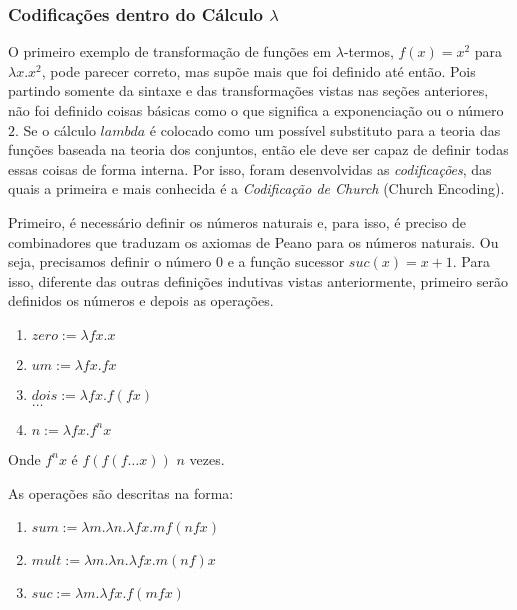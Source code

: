 \documentclass[../main.tex]{subfiles}
\begin{document}
\subsubsection{Codificações dentro do Cálculo \texorpdfstring{$\lambda$}.}

O primeiro exemplo de transformação de funções em $\lambda$-termos, $f(x) = x^2$ para $\lambda x . x^2$, pode parecer correto, mas supõe mais que foi definido até então. Pois partindo somente da sintaxe e das transformações vistas nas seções anteriores, não foi definido coisas básicas como o que significa a exponenciação ou o número $2$. Se o cálculo $lambda$ é colocado como um possível substituto para a teoria das funções baseada na teoria dos conjuntos, então ele deve ser capaz de definir todas essas coisas de forma interna. Por isso, foram desenvolvidas as \emph{codificações}, das quais a primeira e mais conhecida é a \emph{Codificação de Church} (Church Encoding).

Primeiro, é necessário definir os números naturais e, para isso, é preciso de combinadores que traduzam os axiomas de Peano para os números naturais. Ou seja, precisamos definir o número $0$ e a função sucessor $suc (x) = x + 1$. Para isso, diferente das outras definições indutivas vistas anteriormente, primeiro serão definidos os números e depois as operações.

\begin{definition}
    \hfill
    \begin{enumerate}
        \item $zero := \lambda fx .x$
        \item $um := \lambda fx . fx $
        \item $dois := \lambda fx . f(fx)$
        \\$\dots$
        \item $n := \lambda fx . f^n x$
    \end{enumerate}
\end{definition}

Onde $f^n x$ é $f(f(f \dots x))$ $n$ vezes.

As operações são descritas na forma:

\begin{definition}
    \hfill
    \begin{enumerate}
        \item $sum := \lambda m . \lambda n . \lambda fx . m f(nfx)$
        \item $mult := \lambda m . \lambda n . \lambda fx . m (nf) x$
        \item $suc := \lambda m . \lambda fx . f (m f x)$
    \end{enumerate}
\end{definition}
\end{document}
